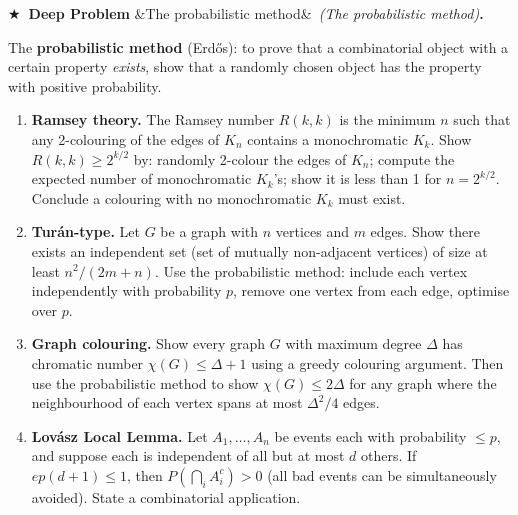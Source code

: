 \documentclass[12pt, a4paper]{article}
\newcounter{problem}
\newcounter{deepproblem}
\newenvironment{deepproblem}[1][]{%
  \refstepcounter{deepproblem}%
  \par\vspace{6pt}%
  \noindent\textbf{\color{NavyBlue}$\bigstar$\ Deep Problem \thedeepproblem}%
  \ifx&#1&\else\ \textit{(#1)}\fi\textbf{.}\enskip
}{\par\vspace{4pt}}
\begin{document}
\begin{deepproblem}[The probabilistic method]
The \textbf{probabilistic method} (Erd\H{o}s): to prove that a combinatorial object with a certain property \emph{exists}, show that a randomly chosen object has the property with positive probability.
\begin{enumerate}[label=(\alph*)]
  \item \textbf{Ramsey theory.} The Ramsey number $R(k,k)$ is the minimum $n$ such that any 2-colouring of the edges of $K_n$ contains a monochromatic $K_k$. Show $R(k,k)\geq 2^{k/2}$ by: randomly 2-colour the edges of $K_n$; compute the expected number of monochromatic $K_k$'s; show it is less than 1 for $n=2^{k/2}$. Conclude a colouring with no monochromatic $K_k$ must exist.
  \item \textbf{Turán-type.} Let $G$ be a graph with $n$ vertices and $m$ edges. Show there exists an independent set (set of mutually non-adjacent vertices) of size at least $n^2/(2m+n)$. Use the probabilistic method: include each vertex independently with probability $p$, remove one vertex from each edge, optimise over $p$.
  \item \textbf{Graph colouring.} Show every graph $G$ with maximum degree $\Delta$ has chromatic number $\chi(G)\leq \Delta+1$ using a greedy colouring argument. Then use the probabilistic method to show $\chi(G)\leq 2\Delta$ for any graph where the neighbourhood of each vertex spans at most $\Delta^2/4$ edges.
  \item \textbf{Lovász Local Lemma.} Let $A_1,\ldots,A_n$ be events each with probability $\leq p$, and suppose each is independent of all but at most $d$ others. If $ep(d+1)\leq 1$, then $P(\bigcap_i A_i^c)>0$ (all bad events can be simultaneously avoided). State a combinatorial application.
\end{enumerate}
\end{deepproblem}
\end{document}
